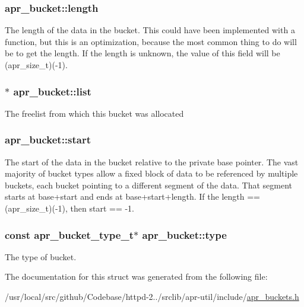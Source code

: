 \subsubsection[{\texorpdfstring{length}{length}}]{ apr\+\_\+bucket\+::length}\hypertarget{structapr__bucket_a0898dfc78d9275187189b9a745e619bf}{}\label{structapr__bucket_a0898dfc78d9275187189b9a745e619bf}
The length of the data in the bucket. This could have been implemented with a function, but this is an optimization, because the most common thing to do will be to get the length. If the length is unknown, the value of this field will be (apr\+\_\+size\+\_\+t)(-\/1). 
\subsubsection[{\texorpdfstring{list}{list}}]{$\ast$ apr\+\_\+bucket\+::list}\hypertarget{structapr__bucket_a5a500b80105834621514d6c0814d0966}{}\label{structapr__bucket_a5a500b80105834621514d6c0814d0966}
The freelist from which this bucket was allocated 
\subsubsection[{\texorpdfstring{start}{start}}]{ apr\+\_\+bucket\+::start}\hypertarget{structapr__bucket_a4a8791b606b3ad613b8672ec94145628}{}\label{structapr__bucket_a4a8791b606b3ad613b8672ec94145628}
The start of the data in the bucket relative to the private base pointer. The vast majority of bucket types allow a fixed block of data to be referenced by multiple buckets, each bucket pointing to a different segment of the data. That segment starts at base+start and ends at base+start+length. If the length == (apr\+\_\+size\+\_\+t)(-\/1), then start == -\/1. 
\subsubsection[{\texorpdfstring{type}{type}}]{\setlength{\rightskip}{0pt plus 5cm}const {\bf apr\+\_\+bucket\+\_\+type\+\_\+t}$\ast$ apr\+\_\+bucket\+::type}\hypertarget{structapr__bucket_ac27fa5ce798e688ad243ebe1615937fc}{}\label{structapr__bucket_ac27fa5ce798e688ad243ebe1615937fc}
The type of bucket. 

The documentation for this struct was generated from the following file\+:\begin{DoxyCompactItemize}
\item 
/usr/local/src/github/\+Codebase/httpd-\/2../srclib/apr-\/util/include/\hyperlink{apr__buckets_8h}{apr\+\_\+buckets.\+h}\end{DoxyCompactItemize}
